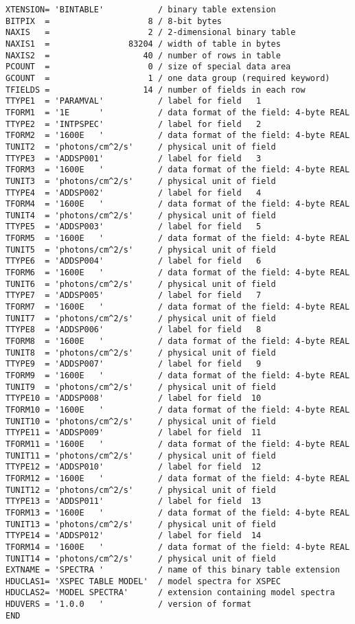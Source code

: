 \documentclass[11pt]{article}
\begin{document}
\begin{verbatim}
XTENSION= 'BINTABLE'           / binary table extension
BITPIX  =                    8 / 8-bit bytes
NAXIS   =                    2 / 2-dimensional binary table
NAXIS1  =                83204 / width of table in bytes
NAXIS2  =                   40 / number of rows in table
PCOUNT  =                    0 / size of special data area
GCOUNT  =                    1 / one data group (required keyword)
TFIELDS =                   14 / number of fields in each row
TTYPE1  = 'PARAMVAL'           / label for field   1
TFORM1  = '1E      '           / data format of the field: 4-byte REAL
TTYPE2  = 'INTPSPEC'           / label for field   2
TFORM2  = '1600E   '           / data format of the field: 4-byte REAL
TUNIT2  = 'photons/cm^2/s'     / physical unit of field
TTYPE3  = 'ADDSP001'           / label for field   3
TFORM3  = '1600E   '           / data format of the field: 4-byte REAL
TUNIT3  = 'photons/cm^2/s'     / physical unit of field
TTYPE4  = 'ADDSP002'           / label for field   4
TFORM4  = '1600E   '           / data format of the field: 4-byte REAL
TUNIT4  = 'photons/cm^2/s'     / physical unit of field
TTYPE5  = 'ADDSP003'           / label for field   5
TFORM5  = '1600E   '           / data format of the field: 4-byte REAL
TUNIT5  = 'photons/cm^2/s'     / physical unit of field
TTYPE6  = 'ADDSP004'           / label for field   6
TFORM6  = '1600E   '           / data format of the field: 4-byte REAL
TUNIT6  = 'photons/cm^2/s'     / physical unit of field
TTYPE7  = 'ADDSP005'           / label for field   7
TFORM7  = '1600E   '           / data format of the field: 4-byte REAL
TUNIT7  = 'photons/cm^2/s'     / physical unit of field
TTYPE8  = 'ADDSP006'           / label for field   8
TFORM8  = '1600E   '           / data format of the field: 4-byte REAL
TUNIT8  = 'photons/cm^2/s'     / physical unit of field
TTYPE9  = 'ADDSP007'           / label for field   9
TFORM9  = '1600E   '           / data format of the field: 4-byte REAL
TUNIT9  = 'photons/cm^2/s'     / physical unit of field
TTYPE10 = 'ADDSP008'           / label for field  10
TFORM10 = '1600E   '           / data format of the field: 4-byte REAL
TUNIT10 = 'photons/cm^2/s'     / physical unit of field
TTYPE11 = 'ADDSP009'           / label for field  11
TFORM11 = '1600E   '           / data format of the field: 4-byte REAL
TUNIT11 = 'photons/cm^2/s'     / physical unit of field
TTYPE12 = 'ADDSP010'           / label for field  12
TFORM12 = '1600E   '           / data format of the field: 4-byte REAL
TUNIT12 = 'photons/cm^2/s'     / physical unit of field
TTYPE13 = 'ADDSP011'           / label for field  13
TFORM13 = '1600E   '           / data format of the field: 4-byte REAL
TUNIT13 = 'photons/cm^2/s'     / physical unit of field
TTYPE14 = 'ADDSP012'           / label for field  14
TFORM14 = '1600E   '           / data format of the field: 4-byte REAL
TUNIT14 = 'photons/cm^2/s'     / physical unit of field
EXTNAME = 'SPECTRA '           / name of this binary table extension
HDUCLAS1= 'XSPEC TABLE MODEL'  / model spectra for XSPEC
HDUCLAS2= 'MODEL SPECTRA'      / extension containing model spectra
HDUVERS = '1.0.0   '           / version of format
END
\end{verbatim}
\end{document}
